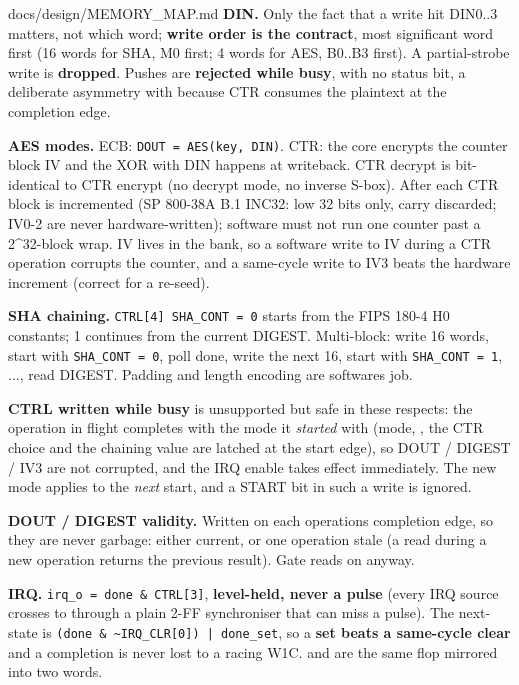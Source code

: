 \begin{relocated}{docs/design/MEMORY_MAP.md}
\textbf{DIN.} Only the fact that a write hit DIN0..3 matters, not which
word; \textbf{write order is the contract}, most significant word first
(16 words for SHA, M0 first; 4 words for AES, B0..B3 first). A
partial-strobe write is \textbf{dropped}. Pushes are \textbf{rejected
while busy}, with no status bit, a deliberate asymmetry with
 because CTR consumes the plaintext at the
completion edge.

\textbf{AES modes.} ECB:
\texttt{DOUT\ =\allowbreak{}\ AES(key,\allowbreak{}\ DIN)}. CTR: the
core encrypts the counter block IV and the XOR with DIN happens at
writeback. CTR decrypt is bit-identical to CTR encrypt (no decrypt mode,
no inverse S-box). After each CTR block  is incremented (SP
800-38A B.1 INC32: low 32 bits only, carry discarded; IV0-2 are never
hardware-written); software must not run one counter past a
2\^{}32-block wrap. IV lives in the bank, so a software write to IV
during a CTR operation corrupts the counter, and a same-cycle write to
IV3 beats the hardware increment (correct for a re-seed).

\textbf{SHA chaining.}
\texttt{CTRL[4]\ SHA\_\allowbreak{}CONT\ =\allowbreak{}\ 0} starts from
the FIPS 180-4 H0 constants; 1 continues from the current DIGEST.
Multi-block: write 16 words, start with
\texttt{SHA\_\allowbreak{}CONT\ =\allowbreak{}\ 0}, poll done, write the
next 16, start with \texttt{SHA\_\allowbreak{}CONT\ =\allowbreak{}\ 1},
..., read DIGEST. Padding and length encoding are
software\textquotesingle s job.

\textbf{CTRL written while busy} is unsupported but safe in these
respects: the operation in flight completes with the mode it
\emph{started} with (mode, , the CTR choice and the
chaining value are latched at the start edge), so DOUT / DIGEST / IV3
are not corrupted, and the IRQ enable takes effect immediately. The new
mode applies to the \emph{next} start, and a START bit in such a write
is ignored.

\textbf{DOUT / DIGEST validity.} Written on each
operation\textquotesingle s completion edge, so they are never garbage:
either current, or one operation stale (a read during a new operation
returns the previous result). Gate reads on  anyway.

\textbf{IRQ.}
\texttt{irq\_\allowbreak{}o\ =\allowbreak{}\ done\ \&\ CTRL[3]},
\textbf{level-held, never a pulse} (every IRQ source crosses
 to  through a plain 2-FF synchroniser
that can miss a pulse). The  next-state is
\texttt{(done\ \&\ \textasciitilde{}IRQ\_\allowbreak{}CLR[0])\ |\ done\_\allowbreak{}set},
so a \textbf{set beats a same-cycle clear} and a completion is never
lost to a racing W1C.  and  are the
same flop mirrored into two words.


\end{relocated}
